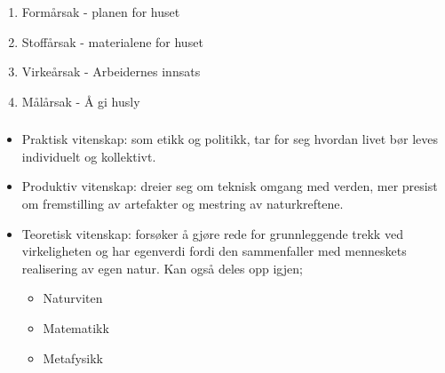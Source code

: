 \documentclass[a4paper]{IEEEtran}
\begin{document}
        \subsubsection{} 
        \begin{enumerate}
            \item Formårsak - planen for huset
            \item Stoffårsak - materialene for huset
            \item Virkeårsak - Arbeidernes innsats
            \item Målårsak - Å gi husly
        \end{enumerate} \cite{rephefte_aristoteles} \medskip
        \subsubsection{}
        \begin{itemize} 
            \item Praktisk vitenskap: som etikk og politikk, tar for seg 
            hvordan livet bør leves individuelt og kollektivt.
            \item Produktiv vitenskap: dreier seg om teknisk omgang med verden, mer 
            presist om fremstilling av artefakter og mestring av naturkreftene.
            \item Teoretisk vitenskap: forsøker å gjøre rede for grunnleggende 
            trekk ved virkeligheten og har egenverdi fordi den sammenfaller
            med menneskets realisering av egen natur. Kan også deles opp igjen;
            \begin{itemize}
                \item Naturviten
                \item Matematikk 
                \item Metafysikk
            \end{itemize}
        \end{itemize} \cite{rephefte_aristoteles} \medskip 
\end{document}
